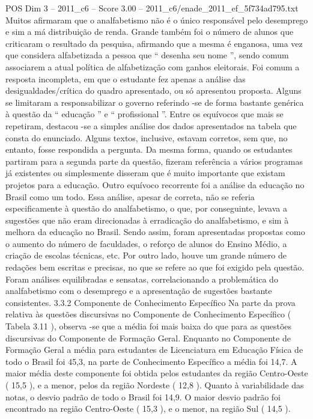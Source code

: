\begin{textsample}{POS Dim 3 – 2011\_c6 – Score 3.00 – 2011\_c6/enade\_2011\_ef\_5f734ad795.txt}
Muitos afirmaram que o analfabetismo não é o único responsável pelo desemprego e sim a má distribuição de renda.
Grande também foi o número de alunos que criticaram o resultado da pesquisa, afirmando que a mesma é enganosa, uma vez que considera alfabetizada a pessoa que “ desenha seu nome ”, sendo comum associarem a atual política de alfabetização com ganhos eleitorais.
Foi comum a resposta incompleta, em que o estudante fez apenas a análise das desigualdades/crítica do quadro apresentado, ou só apresentou proposta.
Alguns se limitaram a responsabilizar o governo referindo -se de forma bastante genérica à questão da “ educação ” e “ profissional ”.
Entre os equívocos que mais se repetiram, destacou -se a simples análise dos dados apresentados na tabela que consta do enunciado.
Alguns textos, inclusive, estavam corretos, sem que, no entanto, fosse respondida a pergunta.
Da mesma forma, quando os estudantes partiram para a segunda parte da questão, fizeram referência a vários programas já existentes ou simplesmente disseram que é muito importante que existam projetos para a educação.
Outro equívoco recorrente foi a análise da educação no Brasil como um todo.
Essa análise, apesar de correta, não se referia especificamente à questão do analfabetismo, o que, por conseguinte, levava a sugestões que não eram direcionadas à erradicação do analfabetismo, e sim à melhora da educação no Brasil.
Sendo assim, foram apresentadas propostas como o aumento do número de faculdades, o reforço de alunos do Ensino Médio, a criação de escolas técnicas, etc.
Por outro lado, houve um grande número de redações bem escritas e precisas, no que se refere ao que foi exigido pela questão.
Foram análises equilibradas e sensatas, correlacionando a problemática do analfabetismo com o desemprego e a apresentação de sugestões bastante consistentes. 3.3.2 Componente de Conhecimento Específico Na parte da prova relativa às questões discursivas no Componente de Conhecimento Específico ( Tabela 3.11 ), observa -se que a média foi mais baixa do que para as questões discursivas do Componente de Formação Geral.
Enquanto no Componente de Formação Geral a média para estudantes de Licenciatura em Educação Física de todo o Brasil foi 45,3, na parte de Conhecimento Específico a média foi 14,7.
A maior média deste componente foi obtida pelos estudantes da região Centro-Oeste ( 15,5 ), e a menor, pelos da região Nordeste ( 12,8 ).
Quanto à variabilidade das notas, o desvio padrão de todo o Brasil foi 14,9.
O maior desvio padrão foi encontrado na região Centro-Oeste ( 15,3 ), e o menor, na região Sul ( 14,5 ).

\end{textsample}
